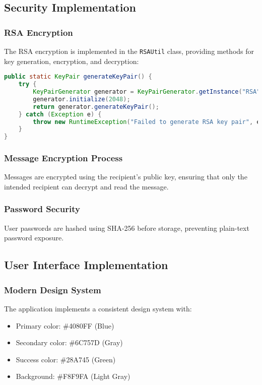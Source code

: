 \documentclass[12pt,a4paper]{article}
\begin{document}
\subsection{Security Implementation}

\subsubsection{RSA Encryption}
The RSA encryption is implemented in the \texttt{RSAUtil} class, providing methods for key generation, encryption, and decryption:

\begin{lstlisting}[language=Java, caption=RSA Key Generation]
public static KeyPair generateKeyPair() {
    try {
        KeyPairGenerator generator = KeyPairGenerator.getInstance("RSA");
        generator.initialize(2048);
        return generator.generateKeyPair();
    } catch (Exception e) {
        throw new RuntimeException("Failed to generate RSA key pair", e);
    }
}
\end{lstlisting}

\subsubsection{Message Encryption Process}
Messages are encrypted using the recipient's public key, ensuring that only the intended recipient can decrypt and read the message.

\subsubsection{Password Security}
User passwords are hashed using SHA-256 before storage, preventing plain-text password exposure.

\subsection{User Interface Implementation}

\subsubsection{Modern Design System}
The application implements a consistent design system with:
\begin{itemize}
    \item Primary color: \#4080FF (Blue)
    \item Secondary color: \#6C757D (Gray)
    \item Success color: \#28A745 (Green)
    \item Background: \#F8F9FA (Light Gray)
\end{itemize}
\end{document}
